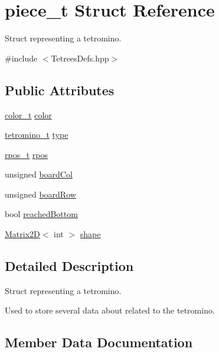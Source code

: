 \hypertarget{structpiece__t}{}\section{piece\+\_\+t Struct Reference}
\label{structpiece__t}


Struct representing a tetromino.  




{\ttfamily \#include $<$Tetrees\+Defs.\+hpp$>$}

\subsection*{Public Attributes}
\begin{DoxyCompactItemize}
\item 
\hyperlink{TetreesDefs_8hpp_a8ba5fbce2446135735693ab60c896bbd}{color\+\_\+t} \hyperlink{structpiece__t_af6408bda8899430d6457a83afb657225}{color}
\item 
\hyperlink{TetreesDefs_8hpp_acd279a62a49ecee418dd808ac39a1795}{tetromino\+\_\+t} \hyperlink{structpiece__t_ac5cbbdb5ff335128af8ca9f491a4f543}{type}
\item 
\hyperlink{TetreesDefs_8hpp_ae8c3bf9765f183eabf1106110513afc6}{rpos\+\_\+t} \hyperlink{structpiece__t_ab1d715c35231b557560096e2d79f4a43}{rpos}
\item 
unsigned \hyperlink{structpiece__t_a1556aab0120dd987a1e679fe13864b2e}{board\+Col}
\item 
unsigned \hyperlink{structpiece__t_a14640fd68c44e80eacbe6adbf8597829}{board\+Row}
\item 
bool \hyperlink{structpiece__t_acb67c9322e157b7dd7c7e0efd212da76}{reached\+Bottom}
\item 
\hyperlink{classMatrix2D}{Matrix2D}$<$ int $>$ \hyperlink{structpiece__t_a3c8f9c2e51c6bab728e564143c439746}{shape}
\end{DoxyCompactItemize}


\subsection{Detailed Description}
Struct representing a tetromino. 

Used to store several data about related to the tetromino. 

\subsection{Member Data Documentation}
\mbox{\label{structpiece__t_a1556aab0120dd987a1e679fe13864b2e}} 
